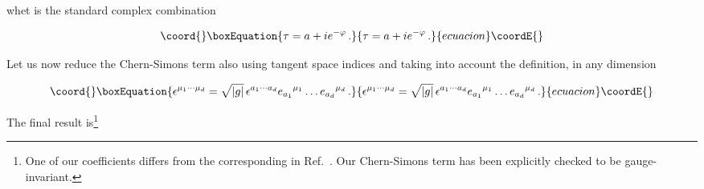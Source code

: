 \documentclass[12pt,a4paper]{article}
\begin{document}
\noindent whet \myHighlight{$\tau$}\coordHE{} is the standard complex combination

\begin{equation}\coord{}\boxEquation{
\tau= a+ie^{-\varphi}\, .  
}{
\tau= a+ie^{-\varphi}\, .  
}{ecuacion}\coordE{}\end{equation}
 
Let us now reduce the Chern-Simons term also using tangent space indices
and taking into account the definition, in any dimension

\begin{equation}\coord{}\boxEquation{
\epsilon^{\mu_{1}\cdots\mu_{d}} = \sqrt{|g|}\, \epsilon^{a_{1}\cdots a_{d}} 
e_{a_{1}}{}^{\mu_{1}} \ldots e_{a_{d}}{}^{\mu_{d}} \, .
}{
\epsilon^{\mu_{1}\cdots\mu_{d}} = \sqrt{|g|}\, \epsilon^{a_{1}\cdots a_{d}} 
e_{a_{1}}{}^{\mu_{1}} \ldots e_{a_{d}}{}^{\mu_{d}} \, .
}{ecuacion}\coordE{}\end{equation}

The final result is\footnote{One of our coefficients differs from the
  corresponding in Ref.~\cite{kn:SaSe}. Our Chern-Simons term has been
  explicitly checked to be gauge-invariant.}
\end{document}
